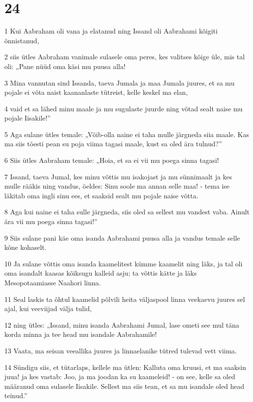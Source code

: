 \chapter{24}

\par 1 Kui Aabraham oli vana ja elatanud ning Issand oli Aabrahami kõigiti õnnistanud,
\par 2 siis ütles Aabraham vanimale sulasele oma peres, kes valitses kõige üle, mis tal oli: „Pane nüüd oma käsi mu puusa alla!
\par 3 Mina vannutan sind Issanda, taeva Jumala ja maa Jumala juures, et sa mu pojale ei võta naist kaananlaste tütreist, kelle keskel ma elan,
\par 4 vaid et sa lähed minu maale ja mu sugulaste juurde ning võtad sealt naise mu pojale Iisakile!”
\par 5 Aga sulane ütles temale: „Võib-olla naine ei taha mulle järgneda siia maale. Kas ma siis tõesti pean su poja viima tagasi maale, kust sa oled ära tulnud?”
\par 6 Siis ütles Aabraham temale: „Hoia, et sa ei vii mu poega sinna tagasi!
\par 7 Issand, taeva Jumal, kes minu võttis mu isakojast ja mu sünnimaalt ja kes mulle rääkis ning vandus, öeldes: Sinu soole ma annan selle maa! - tema ise läkitab oma ingli sinu ees, et saaksid sealt mu pojale naise võtta.
\par 8 Aga kui naine ei taha sulle järgneda, siis oled sa sellest mu vandest vaba. Ainult ära vii mu poega sinna tagasi!”
\par 9 Siis sulane pani käe oma isanda Aabrahami puusa alla ja vandus temale selle kõne kohaselt.
\par 10 Ja sulane võttis oma isanda kaamelitest kümme kaamelit ning läks, ja tal oli oma isandalt kaasas kõiksugu kalleid asju; ta võttis kätte ja läks Mesopotaamiasse Naahori linna.
\par 11 Seal laskis ta õhtul kaamelid põlvili heita väljaspool linna veekaevu juures sel ajal, kui veeviijad välja tulid,
\par 12 ning ütles: „Issand, minu isanda Aabrahami Jumal, lase ometi see mul täna korda minna ja tee head mu isandale Aabrahamile!
\par 13 Vaata, ma seisan veeallika juures ja linnaelanike tütred tulevad vett viima.
\par 14 Sündigu siis, et tütarlaps, kellele ma ütlen: Kalluta oma kruusi, et ma saaksin juua! ja kes vastab: Joo, ja ma joodan ka su kaameleid! - on see, kelle sa oled määranud oma sulasele Iisakile. Sellest ma siis tean, et sa mu isandale oled head teinud.”
